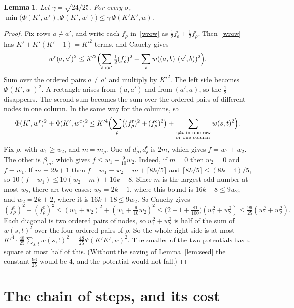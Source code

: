 \documentclass[11pt]{article}
\newtheorem{lemma}{Lemma}
\begin{document}
\begin{lemma}\label{lem:phi}
Let $\gamma=\sqrt{24/25}$. For every $\sigma$,
$\min\bigl(\Phi(K',w^{\mathrm r}),\Phi(K',w^{\mathrm c})\bigr)\le\gamma\,\Phi(K'K',w)$.
\end{lemma}

\begin{proof}
Fix rows $a\ne a'$, and write each $f^{\mathrm r}_\rho$ in~\eqref{wrow} as $\frac12f^{\mathrm r}_\rho+\frac12f^{\mathrm r}_\rho$. Then~\eqref{wrow} has $K'+K'(K'-1)=K'^2$ terms, and Cauchy gives
\[
w^{\mathrm r}(a,a')^2\le K'^2\Bigl(\sum_{b<b'}\tfrac12(f^{\mathrm r}_\rho)^2+\sum_bw((a,b),(a',b))^2\Bigr).
\]
Sum over the ordered pairs $a\ne a'$ and multiply by $K'^2$. The left side becomes $\Phi(K',w^{\mathrm r})^2$. A rectangle arises from $(a,a')$ and from $(a',a)$, so the $\frac12$ disappears. The second sum becomes the sum over the ordered pairs of different nodes in one column. In the same way for the columns, so
\[
\Phi(K',w^{\mathrm r})^2+\Phi(K',w^{\mathrm c})^2\le K'^4\Bigl(\sum_{\rho}\bigl((f^{\mathrm r}_\rho)^2+(f^{\mathrm c}_\rho)^2\bigr)+\sum_{\substack{s\ne t\text{ in one row}\\\text{or one column}}}w(s,t)^2\Bigr).
\]
Fix $\rho$, with $w_1\ge w_2$, and $m=m_\rho$. One of $d^{\mathrm r}_\rho,d^{\mathrm c}_\rho$ is $2m$, which gives $f=w_1+w_2$. The other is $\beta_m$, which gives $f\le w_1+\frac9{10}w_2$. Indeed, if $m=0$ then $w_2=0$ and $f=w_1$. If $m=2k+1$ then $f-w_1=w_2-m+\lceil8k/5\rceil$ and $\lceil8k/5\rceil\le(8k+4)/5$, so $10(f-w_1)\le10(w_2-m)+16k+8$. Since $m$ is the largest odd number at most $w_2$, there are two cases: $w_2=2k+1$, where this bound is $16k+8\le9w_2$; and $w_2=2k+2$, where it is $16k+18\le9w_2$. So Cauchy gives
\[
(f^{\mathrm r}_\rho)^2+(f^{\mathrm c}_\rho)^2\le(w_1+w_2)^2+(w_1+\tfrac9{10}w_2)^2\le\bigl(2+1+\tfrac{81}{100}\bigr)(w_1^2+w_2^2)\le\tfrac{96}{25}(w_1^2+w_2^2).
\]
Each diagonal is two ordered pairs of nodes, so $w_1^2+w_2^2$ is half of the sum of $w(s,t)^2$ over the four ordered pairs of $\rho$. So the whole right side is at most $K'^4\cdot\frac{48}{25}\sum_{s,t}w(s,t)^2=\frac{48}{25}\Phi(K'K',w)^2$. The smaller of the two potentials has a square at most half of this. (Without the saving of Lemma~\ref{lem:seed} the constant $\frac{96}{25}$ would be $4$, and the potential would not fall.)
\end{proof}

\section{The chain of steps, and its cost}\label{sec:chain}
\end{document}
